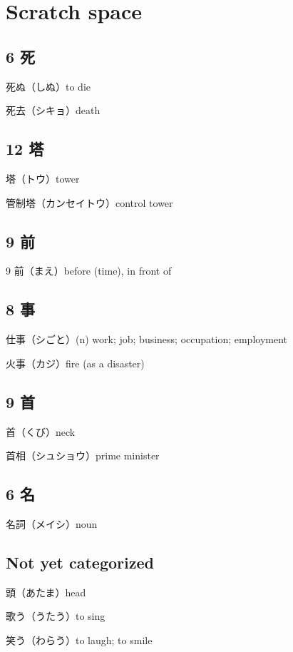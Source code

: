 \chapter{Scratch space}

\section{6 死}

死ぬ（しぬ）to die

死去（シキョ）death

\section{12 塔}

塔（トウ）tower

管制塔（カンセイトウ）control tower

\section{9 前}

9 前（まえ）before (time), in front of

\section{8 事}

仕事（シごと）(n) work; job; business; occupation; employment

火事（カジ）fire (as a disaster)

\section{9 首}

首（くび）neck

首相（シュショウ）prime minister

\section{6 名}

名詞（メイシ）noun

\section{Not yet categorized}

頭（あたま）head

歌う（うたう）to sing

笑う（わらう）to laugh; to smile

